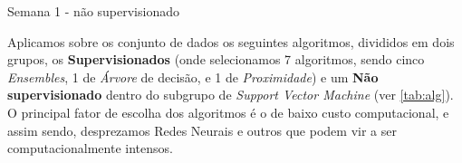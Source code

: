 \documentclass[twoside]{article}
\begin{document}
\begin{table}\scriptsize
    \centering
    
    \caption{Semana 1 - não supervisionado}
    \label{tab:nao-superv-umbalanced}
\normalsize\end{table}

Aplicamos sobre os conjunto de dados os seguintes algoritmos, divididos em dois grupos, os \textbf{Supervisionados} (onde selecionamos 7 algoritmos, sendo cinco \textit{Ensembles}, 1 de \textit{Árvore} de decisão, e 1 de \textit{Proximidade}) e um \textbf{Não supervisionado} dentro do subgrupo de \textit{Support Vector Machine} (ver \cref{tab:alg}). O principal fator de escolha dos algoritmos é o de baixo custo computacional, e assim sendo, desprezamos Redes Neurais e outros que podem vir a ser computacionalmente intensos.
\end{document}
